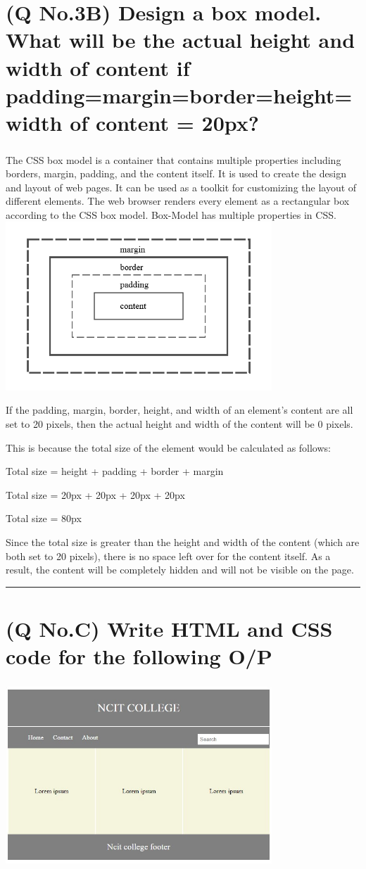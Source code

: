\documentclass[11pt]{article}
\begin{document}
\section{(Q No.3B) Design a box model. What will be the actual height and width of content if padding=margin=border=height=width of content = 20px?}
\subparagraph{}
The CSS box model is a container that contains multiple properties including borders, margin, padding, and the content itself. It is used to create the design and layout of web pages. It can be used as a toolkit for customizing the layout of different elements. The web browser renders every element as a rectangular box according to the CSS box model. Box-Model has multiple properties in CSS. \\
\includegraphics[width=0.75\textwidth]{resources/cssbox.png}

If the padding, margin, border, height, and width of an element's content are all set to 20 pixels, then the actual height and width of the content will be 0 pixels.

This is because the total size of the element would be calculated as follows:

Total size = height + padding + border + margin

Total size = 20px + 20px + 20px + 20px

Total size = 80px

Since the total size is greater than the height and width of the content (which are both set to 20 pixels), there is no space left over for the content itself. As a result, the content will be completely hidden and will not be visible on the page.



\noindent\rule{\linewidth}{0.4pt}
\section{(Q No.C) Write HTML and CSS code for the following O/P}
\subparagraph{}
\includegraphics[width=0.75\textwidth]{resources/qno3c.jpg}
\end{document}
